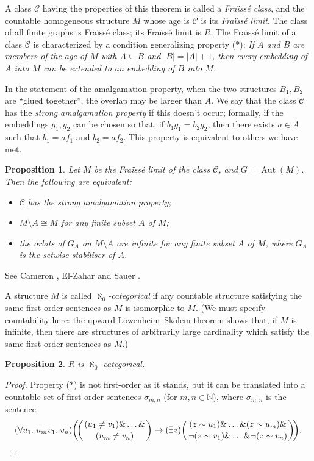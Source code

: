 \documentclass{book}
\newtheorem{proposition}{Proposition}
\DeclareMathOperator{\Aut}{Aut}
\begin{document}
A class $\mathcal{C}$ having the properties of this theorem is called
a \emph{Fra\"{\i}ss\'e class}, and the countable homogeneous structure
$M$ whose age is $\mathcal{C}$ is its \emph{Fra\"{i}ss\'{e} limit}. The
class of all finite graphs is Fra\"{i}ss\'{e} class;
its Fra\"{i}ss\'{e} limit is $R$. The Fra\"{i}ss\'{e}
limit of a class $\mathcal{C}$ is characterized by a condition
generalizing property ($\ast$): 
\emph{If $A$ and $B$ are members of the age of $M$ with $A\subseteq B$
and $|B| = |A| + 1$, then every embedding of $A$ into
$M$ can be extended to an embedding of $B$ into $M$.}

In the statement of the amalgamation property, when the two
structures $B_1, B_2$ are ``glued together'', the overlap may be
larger than $A$. We say that the class $\mathcal{C}$ has the
\emph{strong amalgamation property} if this doesn't occur;
formally, if the embeddings $g_1, g_2$ can be chosen so that, if
$b_1g_1 = b_2g_2$, then there exists $a \in A$ such that $b_1 =
af_1$ and $b_2 = af_2$. This property is equivalent to others we
have met.

\begin{proposition}\label{ch32:prop5.2} 
Let $M$ be the Fra\"{i}ss\'{e} limit of the
class $\mathcal{C}$, and $G = \Aut(M)$. Then the following are
equivalent:
\begin{itemize}
\item[(a)] $\mathcal{C}$ has the strong amalgamation property;
\item[(b)] $M \setminus A \cong M$ for any finite subset $A$ of $M$;
\item[(c)] the orbits of $G_A$ on $M \setminus A$ are infinite for any finite subset $A$ of $M$, where $G_A$
is the setwise stabiliser of $A$.
\end{itemize}
\end{proposition}

See Cameron \cite{ch32:bib6}, El-Zahar and Sauer \cite{ch32:bib15}.

A structure $M$ is called \emph{$\aleph_0$-categorical} if any countable
structure satisfying the same first-order sentences as $M$ is
isomorphic to $M$. (We must specify countability here: the upward
L\"{o}wenheim--Skolem theorem shows that, if $M$ is infinite, then
there are structures of arbitrarily large cardinality which satisfy
the same first-order sentences as $M$.)

\begin{proposition}\label{ch32:prop5.3} 
$R$ is $\aleph_0$-categorical.
\end{proposition}
\begin{proof}
Property ($\ast$) is not first-order as it stands,
but it can be translated into a countable set of first-order
sentences $\sigma_{m,n}$ (for $m, n \in \mathbb{N}$), where
$\sigma_{m,n}$ is the sentence
\[
(\forall u_1..u_mv_1..v_n)\bigg(\!\bigg({(u_1\neq
v_1)\& \ldots \& \atop (u_m \neq v_n)}\bigg)\rightarrow
(\exists z)\bigg({(z\sim u_1)\& \ldots \& (z\sim
u_m)\& \atop \neg(z\sim v_1)\& \ldots \& \neg(z\sim
v_n)}\bigg)\!\bigg).\qedhere
\]
\end{proof}
\end{document}
